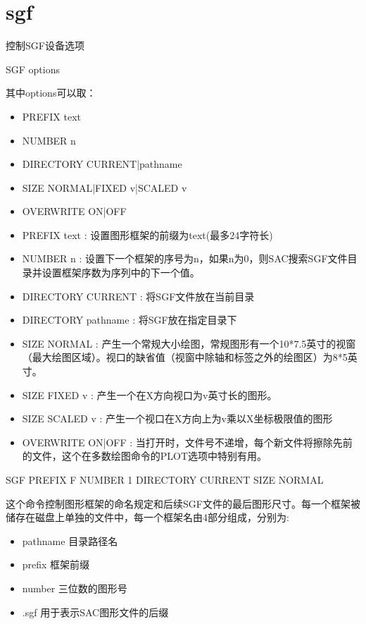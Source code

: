\section{sgf}
\label{cmd:sgf}

控制SGF设备选项

SGF {options}

其中options可以取：
\begin{itemize}
\item PREFIX text  
\item NUMBER n  
\item DIRECTORY CURRENT|pathname  
\item SIZE NORMAL|FIXED v|SCALED v  
\item OVERWRITE ON|OFF  
\end{itemize}

\begin{itemize}
\item PREFIX text : 设置图形框架的前缀为text(最多24字符长)
\item NUMBER n : 设置下一个框架的序号为n，如果n为0，则SAC搜索SGF文件目录并设置框架序数为序列中的下一个值。 
\item DIRECTORY CURRENT : 将SGF文件放在当前目录 
\item DIRECTORY pathname : 将SGF放在指定目录下 
\item SIZE NORMAL : 产生一个常规大小绘图，常规图形有一个10*7.5英寸的视窗（最大绘图区域）。视口的缺省值（视窗中除轴和标签之外的绘图区）为8*5英寸。
\item SIZE FIXED v : 产生一个在X方向视口为v英寸长的图形。 
\item SIZE SCALED v : 产生一个视口在X方向上为v乘以X坐标极限值的图形  
\item OVERWRITE ON|OFF : 当打开时，文件号不递增，每个新文件将擦除先前的文件，这个在多数绘图命令的PLOT选项中特别有用。 
\end{itemize}

SGF PREFIX F NUMBER 1 DIRECTORY CURRENT SIZE NORMAL

这个命令控制图形框架的命名规定和后续SGF文件的最后图形尺寸。每一个框架被储存在磁盘上单独的文件中，每一个框架名由4部分组成，分别为:
\begin{itemize}
\item pathname 目录路径名
\item prefix 框架前缀
\item number 三位数的图形号
\item .sgf 用于表示SAC图形文件的后缀
\end{itemize}


